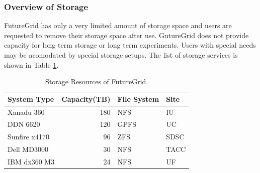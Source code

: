 \subsubsection{Overview of Storage}

FutureGrid has only a very limited amount of storage space and users
are requested to remove their storage space after use. GutureGrid does
not provide capacity for long term storage or long term
experiments. Users with special needs may be acomodated by special
storage setups. The list of storage services is shown in Table \ref{T:storage}.

\begin{table}[htb]
\caption{Storage Resources of FutureGrid.}
\label{T:storage} 

\centering{}%
\begin{tabular}{lrll}
\textbf{System Type } & \textbf{Capacity(TB) } & \textbf{File System } & \textbf{Site }\tabularnewline
\hline 
Xanadu 360  & 180  & NFS  & IU \tabularnewline
DDN 6620  & 120  & GPFS  & UC \tabularnewline
Sunfire x4170  & 96  & ZFS  & SDSC \tabularnewline
Dell MD3000  & 30  & NFS  & TACC \tabularnewline
IBM dx360 M3  & 24  & NFS  & UF \tabularnewline
\end{tabular}
\end{table}

